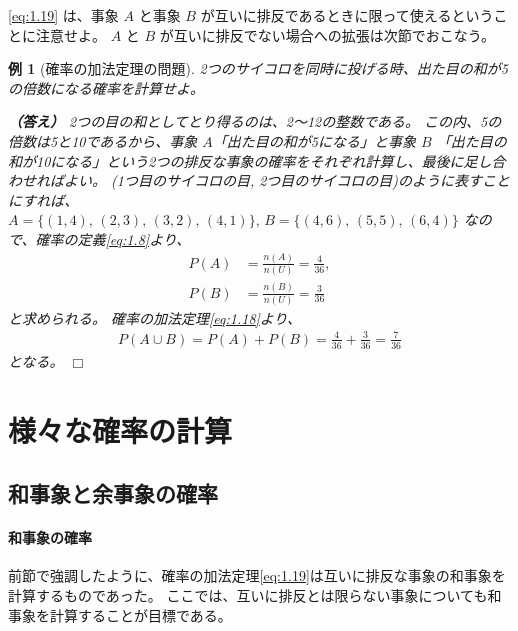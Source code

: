\documentclass[12pt]{ltjsarticle}\usepackage{ifthen}\newcounter{enlarge}\setcounter{enlarge}{1}
\def\qed{\hfill $\Box$}
\newtheorem{eg}{例}
\begin{document}
\eqref{eq:1.19} は、事象 $A$ と事象 $B$ が互いに排反であるときに限って使えるということに注意せよ。
$A$ と $B$ が互いに排反でない場合への拡張は次節でおこなう。

\begin{eg}[確率の加法定理の問題]
  2つのサイコロを同時に投げる時、出た目の和が5の倍数になる確率を計算せよ。

  \textbf{（答え）}
  2つの目の和としてとり得るのは、2〜12の整数である。
  この内、5の倍数は5と10であるから、事象 $A$「出た目の和が5になる」と事象 $B$ 「出た目の和が10になる」という2つの排反な事象の確率をそれぞれ計算し、最後に足し合わせればよい。
  (1つ目のサイコロの目, 2つ目のサイコロの目)のように表すことにすれば、$A = \{(1, 4),\, (2, 3),\, (3, 2),\, (4, 1)\},\, B = \{(4, 6),\, (5, 5),\, (6, 4)\}$ なので、確率の定義\eqref{eq:1.8}より、
  \begin{align}
    P(A) &= \frac{n(A)}{n(U)} = \frac{4}{36}, \\
    P(B) &= \frac{n(B)}{n(U)} = \frac{3}{36}
  \end{align}
  と求められる。
  確率の加法定理\eqref{eq:1.18}より、
  \begin{align}
    P(A \cup B) = P(A) + P(B) = \frac{4}{36} + \frac{3}{36} = \frac{7}{36}
  \end{align}
  となる。
\qed\end{eg}

\section{様々な確率の計算}

\subsection{和事象と余事象の確率}

\paragraph{和事象の確率}

前節で強調したように、確率の加法定理\eqref{eq:1.19}は互いに排反な事象の和事象を計算するものであった。
ここでは、互いに排反とは限らない事象についても和事象を計算することが目標である。
\end{document}
